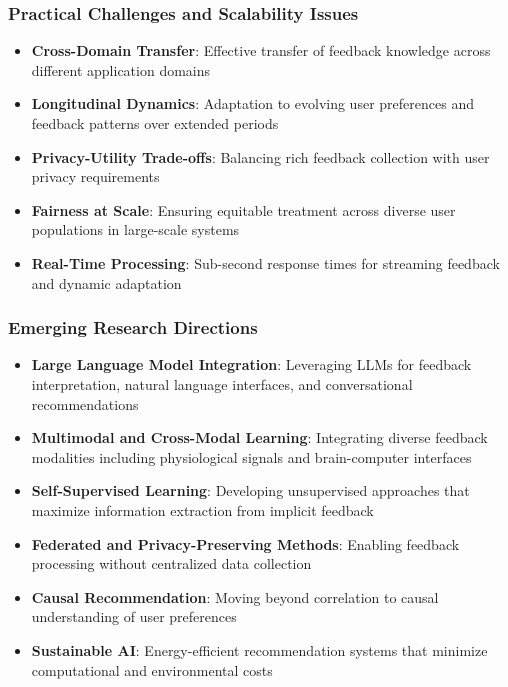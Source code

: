 \subsubsection{Practical Challenges and Scalability Issues}

\begin{itemize}
    \item \textbf{Cross-Domain Transfer}: Effective transfer of feedback knowledge across different application domains
    \item \textbf{Longitudinal Dynamics}: Adaptation to evolving user preferences and feedback patterns over extended periods
    \item \textbf{Privacy-Utility Trade-offs}: Balancing rich feedback collection with user privacy requirements
    \item \textbf{Fairness at Scale}: Ensuring equitable treatment across diverse user populations in large-scale systems
    \item \textbf{Real-Time Processing}: Sub-second response times for streaming feedback and dynamic adaptation
\end{itemize}

\subsubsection{Emerging Research Directions}

\begin{itemize}
    \item \textbf{Large Language Model Integration}: Leveraging LLMs for feedback interpretation, natural language interfaces, and conversational recommendations
    \item \textbf{Multimodal and Cross-Modal Learning}: Integrating diverse feedback modalities including physiological signals and brain-computer interfaces
    \item \textbf{Self-Supervised Learning}: Developing unsupervised approaches that maximize information extraction from implicit feedback
    \item \textbf{Federated and Privacy-Preserving Methods}: Enabling feedback processing without centralized data collection
    \item \textbf{Causal Recommendation}: Moving beyond correlation to causal understanding of user preferences
    \item \textbf{Sustainable AI}: Energy-efficient recommendation systems that minimize computational and environmental costs
\end{itemize}

